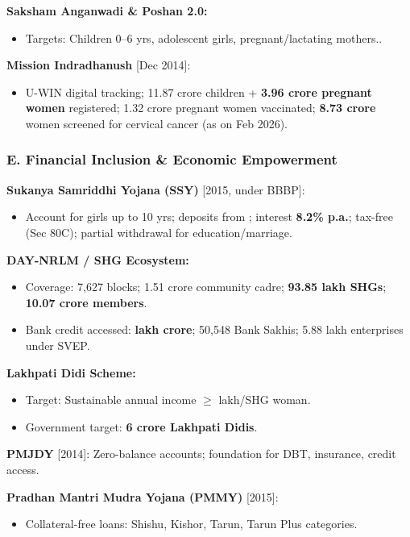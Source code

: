\textbf{Saksham Anganwadi \& Poshan 2.0:}
\begin{itemize}
  \item Targets: Children 0--6 yrs, adolescent girls, pregnant/lactating mothers..
\end{itemize}

\textbf{Mission Indradhanush} [Dec 2014]:
\begin{itemize}
  \item U-WIN digital tracking; 11.87 crore children + \textbf{3.96 crore pregnant women} registered; 1.32 crore pregnant women vaccinated; \textbf{8.73 crore} women screened for cervical cancer (as on Feb 2026).
\end{itemize}

\subsubsection*{E. Financial Inclusion \& Economic Empowerment}

\textbf{Sukanya Samriddhi Yojana (SSY)} [2015, under BBBP]:
\begin{itemize}
  \item Account for girls up to 10 yrs; deposits from ; interest \textbf{8.2\% p.a.}; tax-free (Sec 80C); partial withdrawal for education/marriage.
\end{itemize}

\textbf{DAY-NRLM / SHG Ecosystem:}
\begin{itemize}
  \item Coverage: 7,627 blocks; 1.51 crore community cadre; \textbf{93.85 lakh SHGs}; \textbf{10.07 crore members}.
  \item Bank credit accessed: \textbf{ lakh crore}; 50,548 Bank Sakhis; 5.88 lakh enterprises under SVEP.
\end{itemize}

\textbf{Lakhpati Didi Scheme:}
\begin{itemize}
  \item Target: Sustainable annual income $\geq$  lakh/SHG woman.
  \item Government target: \textbf{6 crore Lakhpati Didis}.
\end{itemize}

\textbf{PMJDY} [2014]: Zero-balance accounts; foundation for DBT, insurance, credit access.

\textbf{Pradhan Mantri Mudra Yojana (PMMY)} [2015]:
\begin{itemize}
  \item Collateral-free loans: Shishu, Kishor, Tarun, Tarun Plus categories.
\end{itemize}

